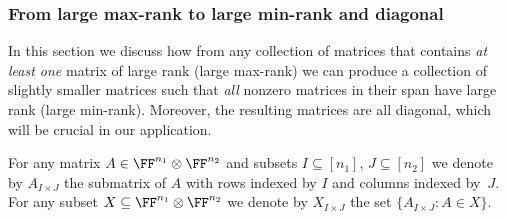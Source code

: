 %
%

%
%
%

%
%

%
%

%
%
%

%
%
%

%
%
%


%
%
%

%
%

%


%

%

%

%

%
%
%
%
%

%
%

%
%



%


%
%
%

%
%
%


%
%
%
%

%
%
%
%

%
%
%

%
%
%

%

%

%

%
%

%
%
%

%
%
%
%

%
%
%
%
%

%

%
%
%

%
%
%
%
%

%
%
%
%
%
%
%

%

\subsubsection{From large max-rank to large min-rank and diagonal}\label{subsec:maxrank-minrank}

In this section we discuss how from any collection of matrices that contains \emph{at least one} matrix of large rank (large max-rank) we can produce a collection of slightly smaller matrices such that \emph{all} nonzero matrices in their span have large rank (large min-rank). Moreover, the resulting matrices are all diagonal, which will be crucial in our application.

For any matrix $A\in \FF^{n_1} \otimes \FF^{n_2}$ %
and subsets $I\subseteq [n_1]$, $J\subseteq [n_2]$ we denote by $A_{I\times J}$ the submatrix of $A$ with rows indexed by $I$ and columns indexed by~$J$.  For any subset $X \subseteq \FF^{n_1} \otimes \FF^{n_2}$ we denote by $X_{I \times J}$ the set $\{A_{I\times J} : A \in X\}$.


